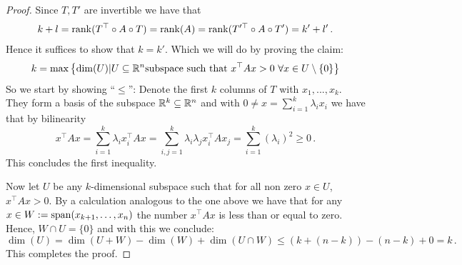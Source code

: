  \begin{proof}
 	Since $T,T'$ are invertible we have that
 	\begin{align}
 		k+l=\operatorname{\mathrm{rank}}(T^\top \circ A\circ T)=\operatorname{\mathrm{rank}}(A)=\operatorname{\mathrm{rank}}(T'^\top \circ A\circ T')=k'+l' \, .
 	\end{align} Hence it suffices to show that $k=k'$. Which we will do by proving the claim:
 	\begin{equation*}
 		k=\max \left\{ \dim(U)|U\subseteq \mathbb{R}^n \text{subspace such that } x^\top Ax>0 ~\forall x\in U\setminus \{0\}  \right\}
 	\end{equation*}
 	So we start by showing \enquote{$\leq$}:
 	Denote the first $k$ columns of $T$ with $x_1,...,x_k$. They form a basis of the subspace $\mathbb{R}^k\subseteq \mathbb{R}^n$ and with $ 0 \neq x=\sum_{i=1}^k\lambda_i x_i$ we have that by bilinearity
 	\begin{equation}
 		x^\top Ax=\sum_{i=1}^{k}\lambda_i x_i^\top A x=\sum_{i,j=1}^{k}\lambda_i \lambda_j x_i^\top A x_j=\sum_{i=1}^{k}(\lambda_i)^2\geq 0 \,. 
 	\end{equation} This concludes the first inequality. 
 	
 	Now let $U$ be any $k$-dimensional subspace such that for all non zero $x\in U$, $x^\top Ax>0$. By a calculation analogous to the one above we have that for any $x\in W:= \operatorname{\mathrm{span}} (x_{k+1},\dots, x_n)$ the number $x^\top Ax$ is less than or equal to zero. Hence, $W\cap U= \{0\}$ and with this we conclude:
 	\begin{equation}
 		\dim(U)=\dim(U+W)-\dim(W)+\dim(U\cap W)\leq (k+(n-k))-(n-k)+0=k\, .
 	\end{equation} This completes the proof.
 \end{proof}
 
